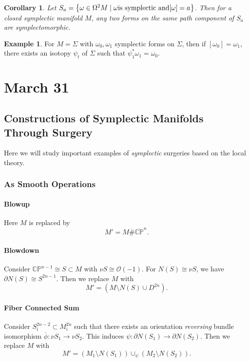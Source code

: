 \documentclass[leqno, openany]{memoir}
\newtheorem{cor}[thm]{Corollary}
\theoremstyle{definition}
\newtheorem{exm}[thm]{Example}
\theoremstyle{remark}
\theoremstyle{plain}
\theoremstyle{definition}
\theoremstyle{remark}
\newcommand{\C}{\mathbb{C}}
\renewcommand{\P}{\mathbb{P}}
\newcommand{\mc}[1]{\mathcal{#1}}
\begin{document}
    \begin{cor}
        Let $S_a = \qty{\omega \in \Omega^2 M \mid \omega \text{is symplectic and} [\omega] = a}$. Then for a closed symplectic manifold $M$, any two forms on the same path component of $S_a$ are symplectomorphic.
    \end{cor}

    \begin{exm}
        For $M = \Sigma$ with $\omega_0, \omega_1$ symplectic forms on $\Sigma$, then if $[\omega_0] = \omega_1$, there exists an isotopy $\psi_t$ of $\Sigma$ such that $\psi_1^* \omega_1 = \omega_0$.
    \end{exm}

    \chapter{March 31}%
    \label{cha:march_31}
    
    \section{Constructions of Symplectic Manifolds Through Surgery}%
    \label{sec:constructions_of_symplectic_manifolds_through_surgery}
    
    Here we will study important examples of \textit{symplectic} surgeries based on the local theory.

    \subsection{As Smooth Operations}%
    \label{sub:as_smooth_opera}

    \subsubsection{Blowup} 
    Here $M$ is replaced by 
    \[ M' = M \# \overline{\C\P}^n. \]

    \subsubsection{Blowdown}%
    \label{ssub:blowdown}
    
    Consider $\C\P^{n-1} \cong S \subset M$ with $\nu S \cong \mc{O}(-1)$. For $N(S) \cong \nu S$, we have $\partial N(S) \cong S^{2n-1}$. Then we replace $M$ with 
    \[ M' = (M \setminus N(S) \cup D^{2n}). \]

    \subsubsection{Fiber Connected Sum}
    Consider $S_i^{2n-2} \subset M_i^{2n}$ such that there exists an orientation \textit{reversing} bundle isomorphism $\overline{\phi}: \nu S_1 \to \nu S_2$. This induces $\psi: \partial N(S_1) \to \partial N(S_2)$. Then we replace $M$ with
    \[ M' = (M_1 \setminus N(S_1)) \cup_{\psi} (M_2 \setminus N(S_2)). \]
    
\end{document}

